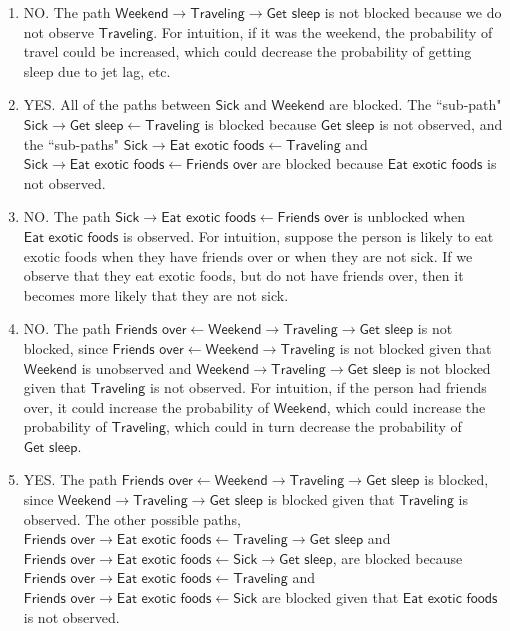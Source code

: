 \documentclass[submit]{harvardml}
\newcommand{\attr}[1]{\textsf{#1}}
\begin{document}
\begin{enumerate}
  \item NO. The path $\attr{Weekend} \rightarrow \attr{Traveling} \rightarrow \attr{Get sleep}$ is not blocked because we do not observe $\attr{Traveling}$. For intuition, if it was the weekend, the probability of travel could be increased, which could decrease the probability of getting sleep due to jet lag, etc.
  \item YES. All of the paths between $\attr{Sick}$ and $\attr{Weekend}$ are blocked. The ``sub-path" $\attr{Sick} \rightarrow \attr{Get sleep} \leftarrow \attr{Traveling}$ is blocked because $\attr{Get sleep}$ is not observed, and the ``sub-paths" $\attr{Sick} \rightarrow \attr{Eat exotic foods} \leftarrow \attr{Traveling}$ and $\attr{Sick} \rightarrow \attr{Eat exotic foods} \leftarrow \attr{Friends over}$ are blocked because $\attr{Eat exotic foods}$ is not observed.
  \item NO. The path $\attr{Sick} \rightarrow \attr{Eat exotic foods} \leftarrow \attr{Friends over}$ is unblocked when $\attr{Eat exotic foods}$ is observed.
  For intuition, suppose the person is likely to eat exotic foods when they have friends over or when they are not sick. If we observe that they eat exotic foods, but do not have friends over, then it becomes more likely that they are not sick.

  \item NO. The path $\attr{Friends over} \leftarrow \attr{Weekend} \rightarrow \attr{Traveling} \rightarrow \attr{Get sleep}$ is not blocked, since $\attr{Friends over} \leftarrow \attr{Weekend} \rightarrow \attr{Traveling}$ is not blocked given that $\attr{Weekend}$ is unobserved and $\attr{Weekend} \rightarrow \attr{Traveling} \rightarrow \attr{Get sleep}$ is not blocked given that $\attr{Traveling}$ is not observed. For intuition, if the person had friends over, it could increase the probability of $\attr{Weekend}$, which could increase the probability of $\attr{Traveling}$, which could in turn decrease the probability of $\attr{Get sleep}$.
  
  \item YES. The path $\attr{Friends over} \leftarrow \attr{Weekend} \rightarrow \attr{Traveling} \rightarrow \attr{Get sleep}$ is blocked, since $\attr{Weekend} \rightarrow \attr{Traveling} \rightarrow \attr{Get sleep}$ is blocked given that $\attr{Traveling}$ is observed. The other possible paths, $\attr{Friends over} \rightarrow \attr{Eat exotic foods} \leftarrow \attr{Traveling} \rightarrow \attr{Get sleep}$ and $\attr{Friends over} \rightarrow \attr{Eat exotic foods} \leftarrow \attr{Sick} \rightarrow \attr{Get sleep}$, are blocked because $\attr{Friends over} \rightarrow \attr{Eat exotic foods} \leftarrow \attr{Traveling}$ and $\attr{Friends over} \rightarrow \attr{Eat exotic foods} \leftarrow \attr{Sick}$ are blocked given that $\attr{Eat exotic foods}$ is not observed.
  

\end{enumerate}
\end{document}
